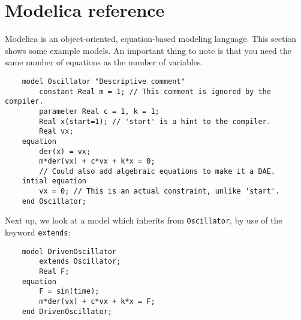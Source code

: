 \part{Modelica reference}
 Modelica is an object-oriented, equation-based modeling language. This section shows some example models. An important thing to note is that you need the same number of equations as the number of variables.
\begin{verbatim}
    model Oscillator "Descriptive comment"
        constant Real m = 1; // This comment is ignored by the compiler.
        parameter Real c = 1, k = 1;
        Real x(start=1); // 'start' is a hint to the compiler.
        Real vx;
    equation
        der(x) = vx;
        m*der(vx) + c*vx + k*x = 0;
        // Could also add algebraic equations to make it a DAE.
    intial equation
        vx = 0; // This is an actual constraint, unlike 'start'.
    end Oscillator;
\end{verbatim}
Next up, we look at a model which inherits from \texttt{Oscillator}, by use of the keyword \texttt{extends}:
\begin{verbatim}
    model DrivenOscillator
        extends Oscillator;
        Real F;
    equation
        F = sin(time);
        m*der(vx) + c*vx + k*x = F;
    end DrivenOscillator;
\end{verbatim}